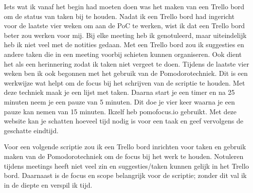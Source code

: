 Iets wat ik vanaf het begin had moeten doen was het maken van een Trello bord om de status van taken bij te houden. Nadat ik een Trello bord had ingericht voor de laatste vier weken om aan de PoC te werken, wist ik dat een Trello bord beter zou werken voor mij. Bij elke meeting heb ik genotuleerd, maar uiteindelijk heb ik niet veel met de notities gedaan. Met een Trello bord zou ik suggesties en andere taken die in een meeting voorbij schieten kunnen organiseren. Ook dient het als een herinnering zodat ik taken niet vergeet te doen. Tijdens de laatste vier weken ben ik ook begonnen met het gebruik van de Pomodorotechniek. Dit is een werkwijze wat helpt om de focus bij het schrijven  van de scriptie te houden. Met deze techniek maak je een lijst met taken. Daarna start je een timer en na 25 minuten neem je een pauze van 5 minuten. Dit doe je vier keer waarna je een pauze kan nemen van 15 minuten. Ikzelf heb pomofocus.io gebruikt. Met deze website kan je schatten hoeveel tijd nodig is voor een taak en geef vervolgens de geschatte eindtijd.

Voor een volgende scriptie zou ik een Trello bord inrichten voor taken en gebruik maken van de Pomodorotechniek om de focus bij het werk te houden. Notuleren tijdens meetings heeft niet veel zin en suggesties/taken kunnen gelijk in het Trello bord. Daarnaast is de focus en scope belangrijk voor de scriptie; zonder dit val ik in de diepte en verspil ik tijd.







